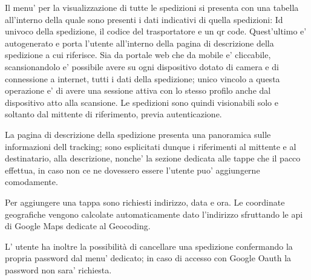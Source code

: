 \documentclass[a4paper, 12pt]{report}
\begin{document}
Il menu’ per la visualizzazione di tutte le spedizioni si presenta con una tabella all’interno della quale sono presenti i dati indicativi di quella spedizioni: Id univoco della spedizione, il codice del trasportatore e un qr code.
Quest’ultimo e’ autogenerato e porta l’utente all’interno della pagina di descrizione della spedizione a cui riferisce.
Sia da portale web che da mobile e’ cliccabile, scansionandolo e’ possibile avere su ogni dispositivo dotato di camera e di connessione a internet, tutti i dati della spedizione;  unico vincolo a questa operazione e’ di avere una sessione attiva con lo stesso profilo anche dal dispositivo atto alla scansione. Le spedizioni sono quindi visionabili solo e soltanto dal mittente di riferimento, previa autenticazione.

La pagina di descrizione della spedizione presenta una panoramica sulle informazioni dell tracking; sono esplicitati dunque i riferimenti al mittente e al destinatario, alla descrizione, nonche’ la sezione dedicata alle tappe che il pacco effettua, in caso non ce ne dovessero essere l’utente puo’ aggiungerne comodamente.

Per aggiungere una tappa sono richiesti indirizzo, data e ora.
Le coordinate geografiche vengono calcolate automaticamente dato l’indirizzo sfruttando le api di Google Maps dedicate al Geocoding.

L’ utente ha inoltre la possibilità di cancellare una spedizione confermando la propria password dal menu’ dedicato; in caso di accesso con Google Oauth la password non sara’ richiesta.
\end{document}
